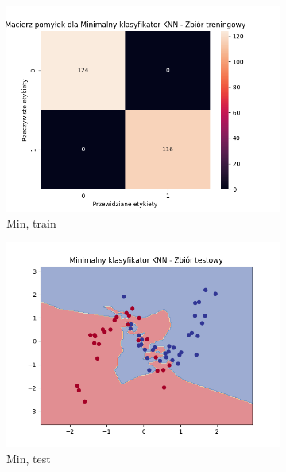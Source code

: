 \documentclass[12pt]{article}
\newcommand*{\subfigwidth}{0.15\textwidth}
\begin{document}
\begin{figure}[H]
\begin{subfigure}[t]{\subfigwidth}
        \includegraphics[width=\linewidth]{img/exp_2/knn/2_3/min/train_matrix.png}
        \caption{Min, train}
    \end{subfigure}
    \hfill
    \begin{subfigure}[t]{\subfigwidth}
        \includegraphics[width=\linewidth]{img/exp_2/knn/2_3/min/test_boundary.png}
        \caption{Min, test}
    \end{subfigure}
    \hfill
    \begin{subfigure}[t]{\subfigwidth}

\end{subfigure}
\end{figure}
\end{document}
